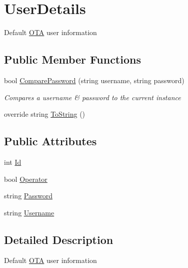 \hypertarget{structOTA_1_1Data_1_1UserDetails}{}\section{User\+Details}
\label{structOTA_1_1Data_1_1UserDetails}


Default \hyperlink{namespaceOTA}{O\+T\+A} user information  


\subsection*{Public Member Functions}
\begin{DoxyCompactItemize}
\item 
bool \hyperlink{structOTA_1_1Data_1_1UserDetails_a321364d287d304a58d44af595a06c2b7}{Compare\+Password} (string username, string password)
\begin{DoxyCompactList}\small\item\em Compares a username \& password to the current instance \end{DoxyCompactList}\item 
override string \hyperlink{structOTA_1_1Data_1_1UserDetails_aa73e7c4dd1df5fd5fbf81c7764ee1533}{To\+String} ()
\end{DoxyCompactItemize}
\subsection*{Public Attributes}
\begin{DoxyCompactItemize}
\item 
int \hyperlink{structOTA_1_1Data_1_1UserDetails_afe0b47b3c92f2f69ea3da50cb72553eb}{Id}
\item 
bool \hyperlink{structOTA_1_1Data_1_1UserDetails_a787f68544bcb150abd250bd7379e2019}{Operator}
\item 
string \hyperlink{structOTA_1_1Data_1_1UserDetails_a9c7aae3a8518d5efd22e991b5944e0d4}{Password}
\item 
string \hyperlink{structOTA_1_1Data_1_1UserDetails_acc7e2f953f8dbfceb1c5a3834b78e3f7}{Username}
\end{DoxyCompactItemize}


\subsection{Detailed Description}
Default \hyperlink{namespaceOTA}{O\+T\+A} user information 



